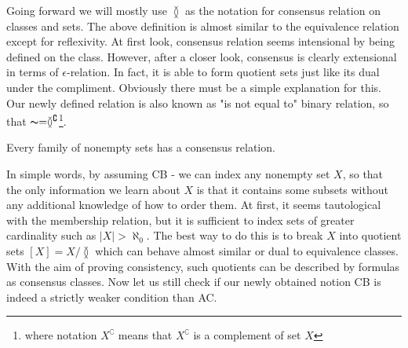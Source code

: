 Going forward we will mostly use $\between$ as the notation for consensus relation on classes and sets. The above definition is almost similar to the equivalence relation except for reflexivity. At first look, consensus relation seems intensional by being defined on the class. However, after a closer look, consensus is clearly extensional in terms of $\epsilon$-relation. In fact, it is able to form quotient sets just like its dual under the compliment. Obviously there must be a simple explanation for this. Our newly defined relation is also known as "is not equal to" binary relation, so that $\thicksim = \between^\complement$\footnote{where notation $X^\complement$ means that $X^\complement$ is a complement of set $X$}.

\begin{axiom}
  Every family of nonempty sets has a consensus relation.
\end{axiom}

In simple words, by assuming CB - we can index any nonempty set $X$, so that the only information we learn about $X$ is that it contains some subsets without any additional knowledge of how to order them. At first, it seems tautological with the membership relation, but it is sufficient to index sets of greater cardinality such as $|X| > \aleph_0$. The best way to do this is to break $X$ into quotient sets $[X] = X/\between$ which can behave almost similar or dual to equivalence classes. With the aim of proving consistency, such quotients can be described by formulas as consensus classes. Now let us still check if our newly obtained notion CB is indeed a strictly weaker condition than AC.

